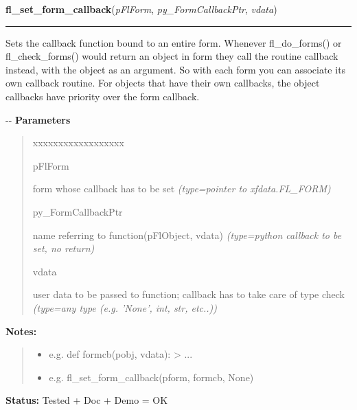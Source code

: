 \hspace{.8\funcindent}\begin{boxedminipage}{\funcwidth}

    \raggedright \textbf{fl\_set\_form\_callback}(\textit{pFlForm}, \textit{py\_FormCallbackPtr}, \textit{vdata})

    \vspace{-1.5ex}

    \rule{\textwidth}{0.5\fboxrule}
\setlength{\parskip}{2ex}

Sets the callback function bound to an entire form. Whenever
fl\_do\_forms() or fl\_check\_forms() would return an object in form they
call the routine callback instead, with the object as an argument. So
with each form you can associate its own callback routine. For objects
that have their own callbacks, the object callbacks have priority over
the form callback.

-{}-
\setlength{\parskip}{1ex}
      \textbf{Parameters}
      \vspace{-1ex}

      \begin{quote}
        \begin{Ventry}{xxxxxxxxxxxxxxxxxx}

          \item[pFlForm]


form whose callback has to be set
            {\it (type=pointer to xfdata.FL\_FORM)}

          \item[py\_FormCallbackPtr]


name referring to function(pFlObject, vdata)
            {\it (type=python callback to be set, no return)}

          \item[vdata]


user data to be passed to function; callback has to take care of
type check
            {\it (type=any type (e.g. 'None', int, str, etc..))}

        \end{Ventry}

      \end{quote}

\textbf{Notes:}
\begin{quote}
  \begin{itemize}

  \item
    \setlength{\parskip}{0.6ex}

e.g. def formcb(pobj, vdata): > ...


  \item 
e.g. fl\_set\_form\_callback(pform, formcb, None)


\end{itemize}

\end{quote}

\textbf{Status:} 
Tested + Doc + Demo = OK


    \end{boxedminipage}

